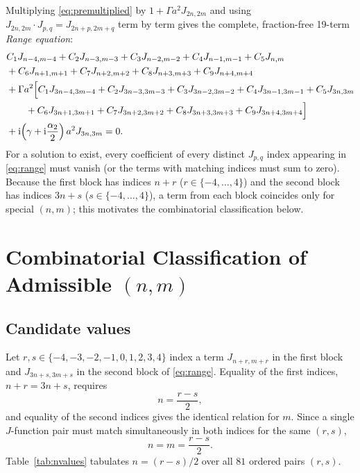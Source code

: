 \documentclass[11pt]{article}
\newcommand{\ii}{\mathrm{i}}
\begin{document}
Multiplying \eqref{eq:premultiplied} by $1+\Gamma a^2J_{2n,2m}$ and using
$J_{2n,2m}\cdot J_{p,q}=J_{2n+p,2m+q}$ term by term gives the complete, fraction-free
19-term \emph{Range equation}:
\begin{align}
&C_1J_{n-4,m-4}+C_2J_{n-3,m-3}+C_3J_{n-2,m-2}+C_4J_{n-1,m-1}+C_5J_{n,m} \notag\\
&+C_6J_{n+1,m+1}+C_7J_{n+2,m+2}+C_8J_{n+3,m+3}+C_9J_{n+4,m+4} \notag\\
&+\Gamma a^2\Big[C_1J_{3n-4,3m-4}+C_2J_{3n-3,3m-3}+C_3J_{3n-2,3m-2}+C_4J_{3n-1,3m-1}+C_5J_{3n,3m} \notag\\
&\qquad+C_6J_{3n+1,3m+1}+C_7J_{3n+2,3m+2}+C_8J_{3n+3,3m+3}+C_9J_{3n+4,3m+4}\Big] \notag\\
&+\ii\!\left(\gamma+\ii\frac{\alpha_2}{2}\right)a^2J_{3n,3m}=0.
\label{eq:range}
\end{align}
For a solution to exist, every coefficient of every distinct $J_{p,q}$ index appearing
in \eqref{eq:range} must vanish (or the terms with matching indices must sum to zero).
Because the first block has indices $n+r$ ($r\in\{-4,\dots,4\}$) and the second block
has indices $3n+s$ ($s\in\{-4,\dots,4\}$), a term from each block coincides only for
special $(n,m)$; this motivates the combinatorial classification below.

\section{Combinatorial Classification of Admissible $(n,m)$}
\label{sec:combinatorics}

\subsection{Candidate values}

Let $r,s\in\{-4,-3,-2,-1,0,1,2,3,4\}$ index a term $J_{n+r,m+r}$ in the first block and
$J_{3n+s,3m+s}$ in the second block of \eqref{eq:range}. Equality of the first indices,
$n+r=3n+s$, requires
\begin{equation}
n=\frac{r-s}{2},
\label{eq:nsolve}
\end{equation}
and equality of the second indices gives the identical relation for $m$. Since a single
$J$-function pair must match simultaneously in both indices for the same $(r,s)$,
\begin{equation}
n=m=\frac{r-s}{2}.
\end{equation}
Table~\ref{tab:nvalues} tabulates $n=(r-s)/2$ over all $81$ ordered pairs $(r,s)$.
\end{document}
